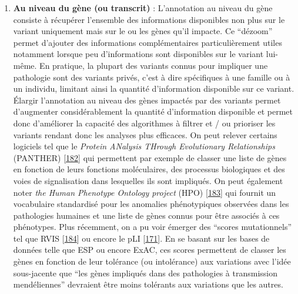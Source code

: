 \documentclass[12pt,a4paper,twoside]{ugathesis}
\providecommand{\tightlist}{%
  \setlength{\itemsep}{0pt}\setlength{\parskip}{0pt}}
\theoremstyle{definition}
\theoremstyle{definition}
\theoremstyle{definition}
\theoremstyle{remark}
\begin{document}
\newpage

\begin{enumerate}
\def\labelenumi{\arabic{enumi}.}
\setcounter{enumi}{1}
\tightlist
\item
  \textbf{Au niveau du gène (ou transcrit)} : L'annotation au niveau du
  gène consiste à récupérer l'ensemble des informations disponibles non
  plus sur le variant uniquement mais sur le ou les gènes qu'il impacte.
  Ce ``dézoom'' permet d'ajouter des informations complémentaires
  particulièrement utiles notamment lorsque peu d'informations sont
  disponibles sur le variant lui-même. En pratique, la plupart des
  variants connus pour impliquer une pathologie sont des variants
  privés, c'est à dire spécifiques à une famille ou à un individu,
  limitant ainsi la quantité d'information disponible sur ce variant.
  Élargir l'annotation au niveau des gènes impactés par des variants
  permet d'augmenter considérablement la quantité d'information
  disponible et permet donc d'améliorer la capacité des algorithmes à
  filtrer et / ou prioriser les variants rendant donc les analyses plus
  efficaces. On peut relever certains logiciels tel que le \emph{Protein
  ANalysis THrough Evolutionary Relationships} (PANTHER)
  {[}\protect\hyperlink{ref-Mi2017}{182}{]} qui permettent par exemple
  de classer une liste de gènes en fonction de leurs fonctions
  moléculaires, des processus biologiques et des voies de signalisation
  dans lesquelles ils sont impliqués. On peut également noter \emph{the
  Human Phenotype Ontology project} (HPO)
  {[}\protect\hyperlink{ref-Kohler2014}{183}{]} qui fournit un
  vocabulaire standardisé pour les anomalies phénotypiques observées
  dans les pathologies humaines et une liste de gènes connus pour être
  associés à ces phénotypes. Plus récemment, on a pu voir émerger des
  ``scores mutationnels'' tel que RVIS
  {[}\protect\hyperlink{ref-Petrovski2013}{184}{]} ou encore le pLI
  {[}\protect\hyperlink{ref-Lek2016}{171}{]}. En se basant sur les bases
  de données telle que ESP ou encore ExAC, ces scores permettent de
  classer les gènes en fonction de leur tolérance (ou intolérance) aux
  variations avec l'idée sous-jacente que ``les gènes impliqués dans des
  pathologies à transmission mendéliennes'' devraient être moins
  tolérants aux variations que les autres.
\end{enumerate}
\end{document}
